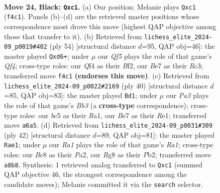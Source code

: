 \documentclass[11pt]{article}
\begin{document}
\clearpage

\begin{figure}[p]\centering
\begin{subfigure}{0.46\textwidth}\centering
\resizebox{\linewidth}{!}{%
\newchessgame
\chessboard[
  setfen={r1b2kr1/1p2bp1p/p5p1/2Bp4/5q2/3K1PN1/PP4PP/1RQ2B1R b - - 2 24},
  showmover=false,
  pgfstyle=straightmove, color=movearrow, markmove={f4-c1}
]}
\caption{}
\end{subfigure}\hfill
\begin{subfigure}{0.46\textwidth}\centering
\resizebox{\linewidth}{!}{%
\newchessgame
\chessboard[
  setfen={1k1r3r/1p3p1p/3qb3/5p1N/1b1n1Q2/2R2P2/1P3BPP/5R1K w - - 7 28},
  showmover=false,
  pgfstyle=straightmove, color=movearrow, markmove={f4-d6}
]}
\caption{}
\end{subfigure}
\\[4pt]
\begin{subfigure}{0.46\textwidth}\centering
\resizebox{\linewidth}{!}{%
\newchessgame
\chessboard[
  setfen={r1br4/1pq2p1p/p3p2k/7n/5bQ1/1BP1B3/PP3PP1/R3R2K w - - 5 21},
  showmover=false,
  pgfstyle=straightmove, color=movearrow, markmove={b3-d1}
]}
\caption{}
\end{subfigure}\hfill
\begin{subfigure}{0.46\textwidth}\centering
\resizebox{\linewidth}{!}{%
\newchessgame
\chessboard[
  setfen={r2qr2k/pp2bQp1/2p3p1/3p2Bn/3P4/4R2P/PPP2PP1/R5K1 w - - 0 22},
  showmover=false,
  pgfstyle=straightmove, color=movearrow, markmove={a1-e1}
]}
\caption{}
\end{subfigure}
\caption{\textbf{Move 24, Black: \texttt{Qxc1}.} (a) Our position; Melanie plays \texttt{Qxc1} (\texttt{f4c1}). Panels (b)--(d) are the retrieved master positions whose correspondence most drove this move (highest QAP objective among those that transfer to it). (b) Retrieved from \texttt{lichess\_elite\_2024-09\_p0019\#402} (ply 54) [structural distance $d$=95, QAP obj=46]: the master played \texttt{Qxd6+}; under $\mu$ our \emph{Qf5} plays the role of that game's \emph{Qf4}; cross-type roles: our \emph{Q}f4 as their \emph{B}f2, our \emph{B}e7 as their \emph{R}c3; transferred move \texttt{f4c1} \textbf{(endorses this move)}. (c) Retrieved from \texttt{lichess\_elite\_2024-09\_p0022\#2169} (ply 40) [structural distance $d$=85, QAP obj=83]: the master played \texttt{Bd1}; under $\mu$ our \emph{Pa3} plays the role of that game's \emph{Bb3} (a \textbf{cross-type} correspondence); cross-type roles: our \emph{b}c5 as their \emph{R}a1, our \emph{B}e7 as their \emph{R}e1; transferred move \texttt{a6a5}. (d) Retrieved from \texttt{lichess\_elite\_2024-09\_p0031\#309} (ply 42) [structural distance $d$=89, QAP obj=81]: the master played \texttt{Rae1}; under $\mu$ our \emph{Ra1} plays the role of that game's \emph{Ra1}; cross-type roles: our \emph{B}c8 as their \emph{P}a2, our \emph{R}g8 as their \emph{P}b2; transferred move \texttt{a8b8}. Synthesis: 1 retrieved analog transferred to \texttt{Qxc1} (summed QAP objective 46, the strongest correspondence among the candidate moves); Melanie committed it via the \texttt{search} selector.}
\label{fig:thought-m47}
\end{figure}
\end{document}
